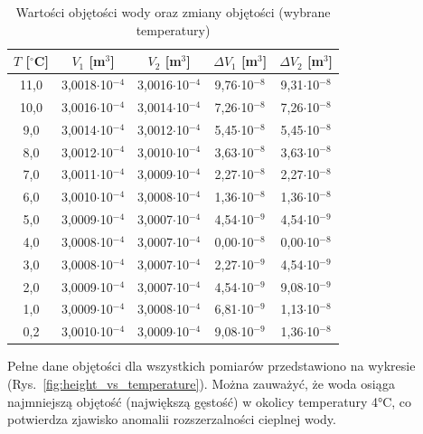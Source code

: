 \documentclass[a4paper,12pt]{article}
\begin{document}
\begin{table}[H]
    \centering
    \caption{Wartości objętości wody oraz zmiany objętości (wybrane temperatury)}
    \label{tab:objetosci}
    \begin{tabular}{|c|c|c|c|c|}
        \hline
        $T$ [$^\circ$C] & $V_1$ [m$^3$] & $V_2$ [m$^3$] & $\Delta V_1$ [m$^3$] & $\Delta V_2$ [m$^3$] \\
        \hline
        11,0 & 3,0018$\cdot$10$^{-4}$ & 3,0016$\cdot$10$^{-4}$ & 9,76$\cdot$10$^{-8}$ & 9,31$\cdot$10$^{-8}$ \\
        10,0 & 3,0016$\cdot$10$^{-4}$ & 3,0014$\cdot$10$^{-4}$ & 7,26$\cdot$10$^{-8}$ & 7,26$\cdot$10$^{-8}$ \\
        9,0 & 3,0014$\cdot$10$^{-4}$ & 3,0012$\cdot$10$^{-4}$ & 5,45$\cdot$10$^{-8}$ & 5,45$\cdot$10$^{-8}$ \\
        8,0 & 3,0012$\cdot$10$^{-4}$ & 3,0010$\cdot$10$^{-4}$ & 3,63$\cdot$10$^{-8}$ & 3,63$\cdot$10$^{-8}$ \\
        7,0 & 3,0011$\cdot$10$^{-4}$ & 3,0009$\cdot$10$^{-4}$ & 2,27$\cdot$10$^{-8}$ & 2,27$\cdot$10$^{-8}$ \\
        6,0 & 3,0010$\cdot$10$^{-4}$ & 3,0008$\cdot$10$^{-4}$ & 1,36$\cdot$10$^{-8}$ & 1,36$\cdot$10$^{-8}$ \\
        5,0 & 3,0009$\cdot$10$^{-4}$ & 3,0007$\cdot$10$^{-4}$ & 4,54$\cdot$10$^{-9}$ & 4,54$\cdot$10$^{-9}$ \\
        4,0 & 3,0008$\cdot$10$^{-4}$ & 3,0007$\cdot$10$^{-4}$ & 0,00$\cdot$10$^{-8}$ & 0,00$\cdot$10$^{-8}$ \\
        3,0 & 3,0008$\cdot$10$^{-4}$ & 3,0007$\cdot$10$^{-4}$ & 2,27$\cdot$10$^{-9}$ & 4,54$\cdot$10$^{-9}$ \\
        2,0 & 3,0009$\cdot$10$^{-4}$ & 3,0007$\cdot$10$^{-4}$ & 4,54$\cdot$10$^{-9}$ & 9,08$\cdot$10$^{-9}$ \\
        1,0 & 3,0009$\cdot$10$^{-4}$ & 3,0008$\cdot$10$^{-4}$ & 6,81$\cdot$10$^{-9}$ & 1,13$\cdot$10$^{-8}$ \\
        0,2 & 3,0010$\cdot$10$^{-4}$ & 3,0009$\cdot$10$^{-4}$ & 9,08$\cdot$10$^{-9}$ & 1,36$\cdot$10$^{-8}$ \\
        \hline
    \end{tabular}
\end{table}

Pełne dane objętości dla wszystkich pomiarów przedstawiono na wykresie (Rys.~\ref{fig:height_vs_temperature}). Można zauważyć, że woda osiąga najmniejszą objętość (największą gęstość) w okolicy temperatury 4°C, co potwierdza zjawisko anomalii rozszerzalności cieplnej wody.
\end{document}

